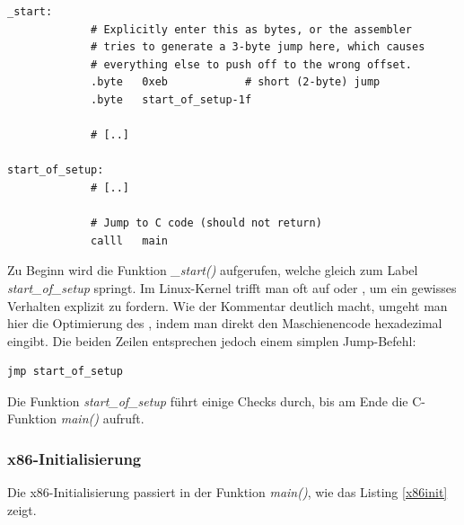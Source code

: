 \begin{lstlisting}[label=firstcall,caption=linux/arch/x86/boot/header.S]
_start:
             # Explicitly enter this as bytes, or the assembler
             # tries to generate a 3-byte jump here, which causes
             # everything else to push off to the wrong offset.
             .byte   0xeb            # short (2-byte) jump
             .byte   start_of_setup-1f

             # [..]

start_of_setup:
             # [..]

             # Jump to C code (should not return)
             calll   main
\end{lstlisting}

Zu Beginn wird die Funktion \emph{\_start()} aufgerufen, welche gleich zum Label \emph{start\_of\_setup} springt. Im Linux-Kernel trifft
man oft auf  oder , um ein gewisses Verhalten explizit zu fordern. Wie der Kommentar
deutlich macht, umgeht man hier die Optimierung des , indem man direkt den Maschienencode hexadezimal eingibt.
Die beiden Zeilen entsprechen jedoch einem simplen Jump-Befehl:
\begin{lstlisting}
jmp start_of_setup
\end{lstlisting}

Die Funktion \emph{start\_of\_setup} führt einige Checks durch, bis am Ende die C-Funktion \emph{main()} aufruft.

\subsubsection{x86-Initialisierung}

Die x86-Initialisierung passiert in der Funktion \emph{main()}, wie das Listing \ref{x86init} zeigt.

